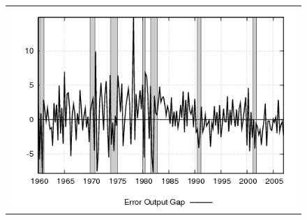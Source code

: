 \begin{figure}[ht]
\begin{center}
\begin{tabular}{c}
\includegraphics[scale=0.5]{results_cg_wlsinit/output_err.png} 
\end{tabular}
\end{center}
\end{figure}

